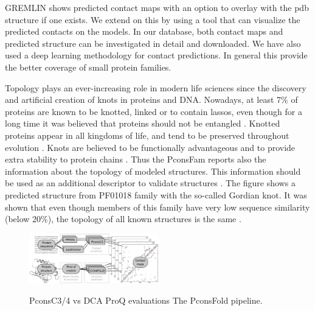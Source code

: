 \documentclass[a4,center,fleqn]{NAR}
\begin{document}
GREMLIN shows predicted contact maps with an option to overlay with
the pdb structure if one exists. We extend on this by using a tool
that can visualize the predicted contacts on the models. In our
database, both contact maps and predicted structure can be
investigated in detail and downloaded.  We have also used a deep
learning methodology for contact predictions. In general this provide
the better coverage of small protein families.


Topology plays an ever-increasing role in modern life sciences since
the discovery and artificial creation of knots in proteins and DNA.
Nowadays, at least 7\% of proteins are known to be knotted, linked or
to contain lassos, even though for a long time it was believed that
proteins should not be entangled \cite{sulkowska2018entangled}. Knotted proteins appear in all
kingdoms of life, and tend to be preserved throughout evolution \cite{sulkowska2012conservation}. 
Knots are believed to be functionally advantageous and to provide extra
stability to protein chains \cite{christian2016methyl}.
Thus the PconsFam reports also the information about the topology of
modeled structures. This information should be used as an additional
descriptor to validate structures \cite{khatib2006rapid}. The figure shows a
predicted structure from PF01018 family with the so-called Gordian
knot. It was shown that even though members of this family have very
low sequence similarity (below 20\%), the topology of all known
structures is the same \cite{sulkowska2012conservation}.


\begin{figure}[t]
\begin{center}
\end{center}
\caption{PconsC3/4 vs DCA
ProQ evaluations 
The PconsFold pipeline.}
    \includegraphics[width=0.5\textwidth]{figures/flowchart.eps}
\label{fig:Pipeline}
\end{figure}
\end{document}
